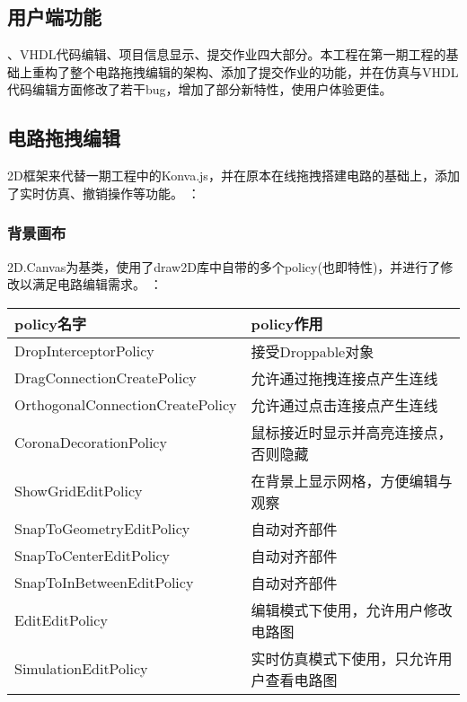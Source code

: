 \documentclass{article}
\begin{document}
\begin{CJK}{UTF8}{gbsn}
\CJKindent
\section{用户端功能}

、VHDL代码编辑、项目信息显示、提交作业四大部分。本工程在第一期工程的基础上重构了整个电路拖拽编辑的架构、添加了提交作业的功能，并在仿真与VHDL代码编辑方面修改了若干bug，增加了部分新特性，使用户体验更佳。

\subsection{电路拖拽编辑}
    2D框架来代替一期工程中的Konva.js，并在原本在线拖拽搭建电路的基础上，添加了实时仿真、撤销操作等功能。
    ：
\subsubsection{背景画布}
    2D.Canvas为基类，使用了draw2D库中自带的多个policy(也即特性)，并进行了修改以满足电路编辑需求。
    ：
    \begin{table}[!h]
    \begin{tabular}{|l|l|}
    \hline
    policy名字 & policy作用 \\
    \hline
    DropInterceptorPolicy & 接受Droppable对象 \\
    \hline
    DragConnectionCreatePolicy & 允许通过拖拽连接点产生连线 \\
    \hline
    OrthogonalConnectionCreatePolicy & 允许通过点击连接点产生连线 \\
    \hline
    CoronaDecorationPolicy & 鼠标接近时显示并高亮连接点，否则隐藏 \\
    \hline
    ShowGridEditPolicy & 在背景上显示网格，方便编辑与观察 \\
    \hline
    SnapToGeometryEditPolicy & 自动对齐部件 \\
    \hline
    SnapToCenterEditPolicy & 自动对齐部件 \\
    \hline
    SnapToInBetweenEditPolicy & 自动对齐部件 \\
    \hline
    EditEditPolicy & 编辑模式下使用，允许用户修改电路图 \\
    \hline
    SimulationEditPolicy & 实时仿真模式下使用，只允许用户查看电路图 \\
    \hline


\end{tabular}
\end{table}
\end{CJK}
\end{document}
